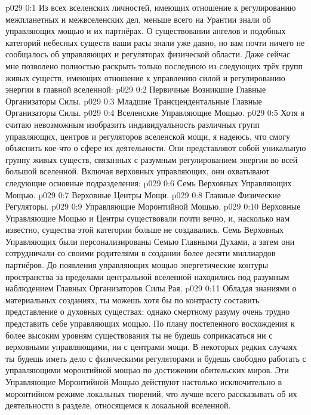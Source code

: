 \author{Всеобщий Цензор}
\vs p029 0:1 Из всех вселенских личностей, имеющих отношение к регулированию межпланетных и межвселенских дел, меньше всего на Урантии знали об управляющих мощью и их партнёрах. О существовании ангелов и подобных категорий небесных существ ваши расы знали уже давно, но вам почти ничего не сообщалось об управляющих и регуляторах физической области. Даже сейчас мне позволено полностью раскрыть только последнюю из следующих трёх групп живых существ, имеющих отношение к управлению силой и регулированию энергии в главной вселенной:
\vs p029 0:2 Первичные Возникшие Главные Организаторы Силы.
\vs p029 0:3 Младшие Трансцендентальные Главные Организаторы Силы.
\vs p029 0:4 Вселенские Управляющие Мощью.
\vs p029 0:5 \pc Хотя я считаю невозможным изобразить индивидуальность различных групп управляющих, центров и регуляторов вселенской мощи, я надеюсь, что смогу объяснить кое\hyp{}что о сфере их деятельности. Они представляют собой уникальную группу живых существ, связанных с разумным регулированием энергии во всей большой вселенной. Включая верховных управляющих, они охватывают следующие основные подразделения:
\vs p029 0:6 Семь Верховных Управляющих Мощью.
\vs p029 0:7 Верховные Центры Мощи.
\vs p029 0:8 Главные Физические Регуляторы.
\vs p029 0:9 Управляющие Моронтийной Мощью.
\vs p029 0:10 \pc Верховные Управляющие Мощью и Центры существовали почти вечно, и, насколько нам известно, существа этой категории больше не создавались. Семь Верховных Управляющих были персонализированы Семью Главными Духами, а затем они сотрудничали со своими родителями в создании более десяти миллиардов партнёров. До появления управляющих мощью энергетические контуры пространства за пределами центральной вселенной находились под разумным наблюдением Главных Организаторов Силы Рая.
\vs p029 0:11 Обладая знаниями о материальных созданиях, ты можешь хотя бы по контрасту составить представление о духовных существах; однако смертному разуму очень трудно представить себе управляющих мощью. По плану постепенного восхождения к более высоким уровням существования ты не будешь соприкасаться ни с верховными управляющими, ни с центрами мощи. В некоторых редких случаях ты будешь иметь дело с физическими регуляторами и будешь свободно работать с управляющими моронтийной мощью по достижении обительских миров. Эти Управляющие Моронтийной Мощью действуют настолько исключительно в моронтийном режиме локальных творений, что лучше всего рассказывать об их деятельности в разделе, относящемся к локальной вселенной.
